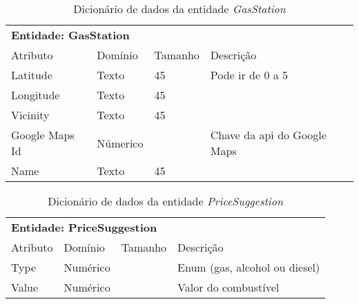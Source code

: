 \begin{table}[]
\centering
\caption{Dicionário de dados da entidade \textit{GasStation}}
\label{my-label}
\begin{tabular}{llll}
\multicolumn{4}{l}{\textbf{Entidade: GasStation}}                                                                                    \\
\rowcolor[HTML]{343434}
{\color[HTML]{FFFFFF} Atributo} & {\color[HTML]{FFFFFF} Domínio} & {\color[HTML]{FFFFFF} Tamanho} & {\color[HTML]{FFFFFF} Descrição} \\
Latitude                        & Texto                          & 45                             & Pode ir de 0 a 5                 \\
Longitude                       & Texto                          & 45                             &                                  \\
Vicinity                        & Texto                          & 45                             &                                  \\
Google Maps Id                  & Númerico                       &                                & Chave da api do Google Maps      \\
Name                            & Texto                          & 45                             &
\end{tabular}
\end{table}

\begin{table}[]
\centering
\caption{Dicionário de dados da entidade \textit{PriceSuggestion}}
\label{my-label}
\begin{tabular}{llll}
\multicolumn{4}{l}{\textbf{Entidade: PriceSuggestion}}                                                                               \\
\rowcolor[HTML]{343434}
{\color[HTML]{FFFFFF} Atributo} & {\color[HTML]{FFFFFF} Domínio} & {\color[HTML]{FFFFFF} Tamanho} & {\color[HTML]{FFFFFF} Descrição} \\
Type                            & Numérico                       &                                & Enum (gas, alcohol ou diesel)    \\
Value                           & Numérico                       &                                & Valor do combustível
\end{tabular}
\end{table}

